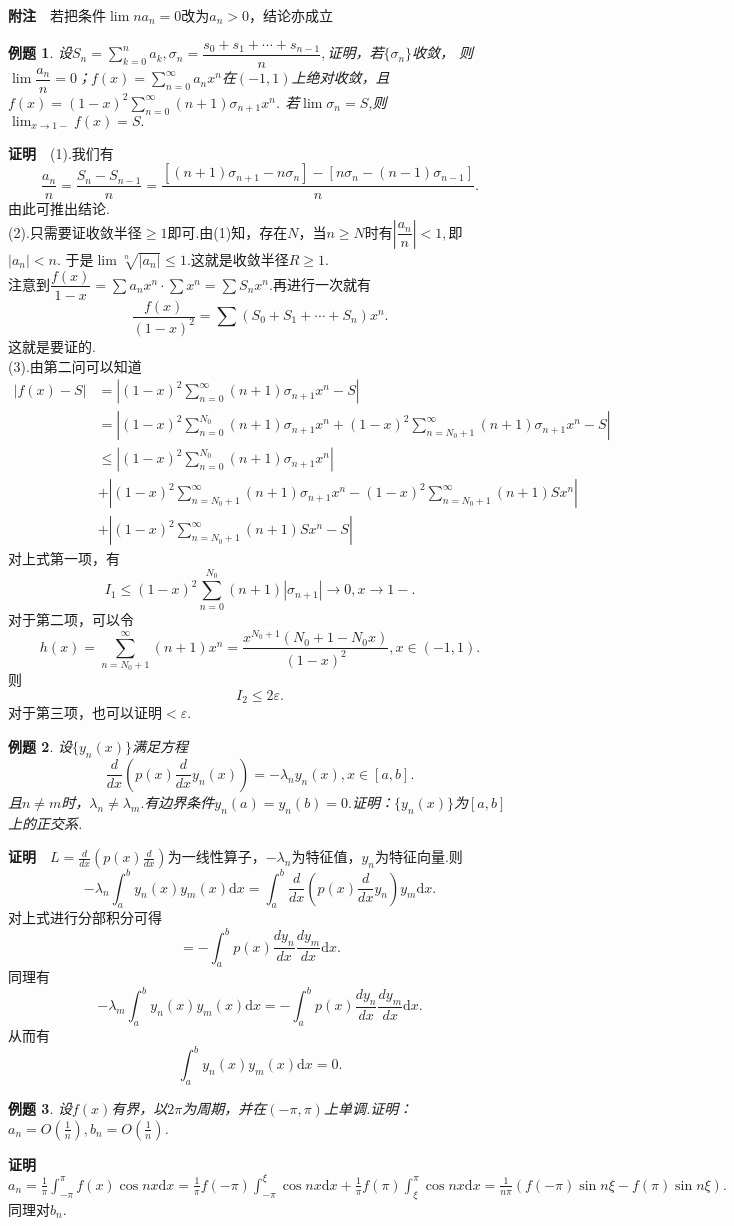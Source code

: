 \documentclass[UTF8]{article}
\newcommand{\dx}{\mathrm{d}x}
\newcommand{\zm}{\textbf{证明}$\quad$}
\newcommand{\fz}{\textbf{附注}$\quad$}
\newtheorem{exa}{\hspace{2em}例题}[section]
\begin{document}
  \fz 若把条件$\lim na_n=0$改为$a_n>0$，结论亦成立
  \begin{exa}
    设$S_n=\sum\limits_{k=0}^na_k,\sigma_n=\dfrac{s_0+s_1+\cdots+s_{n-1}}{n},$证明，若$\{\sigma_n\}$收敛，
    则$\lim\dfrac{a_n}{n}=0$；$f(x)=\sum\limits_{n=0}^\infty a_nx^n$在$(-1,1)$上绝对收敛，且
    $f(x)=(1-x)^2\sum\limits_{n=0}^\infty(n+1)\sigma_{n+1}x^n$. 若$\lim \sigma_n=S$,则$\lim_{x\to1-}f(x)=S.$
  \end{exa}
  \zm (1).我们有
  $$\frac{a_n}{n}=\frac{S_n-S_{n-1}}{n}=\frac{[(n+1)\sigma_{n+1}-n\sigma_n]-[n\sigma_n-(n-1)\sigma_{n-1}]}{n}.$$
  由此可推出结论.\\
  (2).只需要证收敛半径$\ge 1$即可.由(1)知，存在$N$，当$n\ge N$时有$\left|\dfrac{a_n}{n}\right|<1,$即$|a_n|<n.$
  于是$\lim\sqrt[n]{|a_n|}\le 1.$这就是收敛半径$R\ge 1.$\\
  注意到$\dfrac{f(x)}{1-x}=\sum a_nx^n\cdot \sum x^n=\sum S_nx^n.$再进行一次就有
  $$\frac{f(x)}{(1-x)^2}=\sum(S_0+S_1+\cdots+S_n)x^n.$$
  这就是要证的.\\
  (3).由第二问可以知道
  \begin{align*}
    \left|f(x)-S\right|&=\left|(1-x)^2\sum_{n=0}^\infty(n+1)\sigma_{n+1}x^n-S\right|\\
    &=\left|(1-x)^2\sum_{n=0}^{N_0}(n+1)\sigma_{n+1}x^n+(1-x)^2\sum_{n=N_0+1}^\infty(n+1)\sigma_{n+1}x^n-S\right|\\
    &\le\left|(1-x)^2\sum_{n=0}^{N_0}(n+1)\sigma_{n+1}x^n\right|\\&+
    \left|(1-x)^2\sum_{n=N_0+1}^\infty(n+1)\sigma_{n+1}x^n-(1-x)^2\sum_{n=N_0+1}^\infty(n+1)Sx^n\right|\\&+
    \left|(1-x)^2\sum_{n=N_0+1}^\infty(n+1)Sx^n-S\right|
  \end{align*}
  对上式第一项，有
  $$I_1\le(1-x)^2\sum_{n=0}^{N_0}(n+1)|\sigma_{n+1}|\to0,x\to1-.$$
  对于第二项，可以令
  $$h(x)=\sum_{n=N_0+1}^\infty(n+1)x^n=\frac{x^{N_0+1}(N_0+1-N_0x)}{(1-x)^2},x\in(-1,1).$$
  则$$I_2\le 2\varepsilon.$$
  对于第三项，也可以证明$<\varepsilon.$

  \begin{exa}
    设$\{y_n(x)\}$满足方程
    $$\frac{d}{dx}(p(x)\frac{d}{dx}y_n(x))=-\lambda_ny_n(x),x\in[a,b].$$
    且$n\ne m$时，$\lambda_n\ne\lambda_m.$有边界条件$y_n(a)=y_n(b)=0.$证明：$\{y_n(x)\}$为$[a,b]$上的正交系.
  \end{exa}
  \zm $L=\frac{d}{dx}(p(x)\frac{d}{dx})$为一线性算子，$-\lambda_n$为特征值，$y_n$为特征向量.则
  $$-\lambda_n\int_a^by_n(x)y_m(x)\dx=\int_a^b\frac{d}{dx}(p(x)\frac{d}{dx}y_n)y_m\dx.$$
  对上式进行分部积分可得
  $$=-\int_a^bp(x)\frac{dy_n}{dx}\frac{dy_m}{dx}\dx.$$
  同理有
  $$-\lambda_m\int_a^by_n(x)y_m(x)\dx=-\int_a^bp(x)\frac{dy_n}{dx}\frac{dy_m}{dx}\dx.$$
  从而有
  $$\int_a^by_n(x)y_m(x)\dx=0.$$
  \begin{exa}
    设$f(x)$有界，以$2\pi$为周期，并在$(-\pi,\pi)$上单调.证明：$a_n=O(\frac{1}{n}),b_n=O(\frac{1}{n})$.
  \end{exa}
  \zm $a_n=\frac{1}{\pi}\int_{-\pi}^\pi f(x)\cos nx\dx=\frac{1}{\pi}f(-\pi)\int_{-\pi}^\xi\cos nx\dx+
  \frac{1}{\pi}f(\pi)\int_\xi^\pi\cos nx\dx=\frac{1}{n\pi}(f(-\pi)\sin n\xi-f(\pi)\sin n\xi).$
  同理对$b_n.$
  \clearpage
\end{document}
